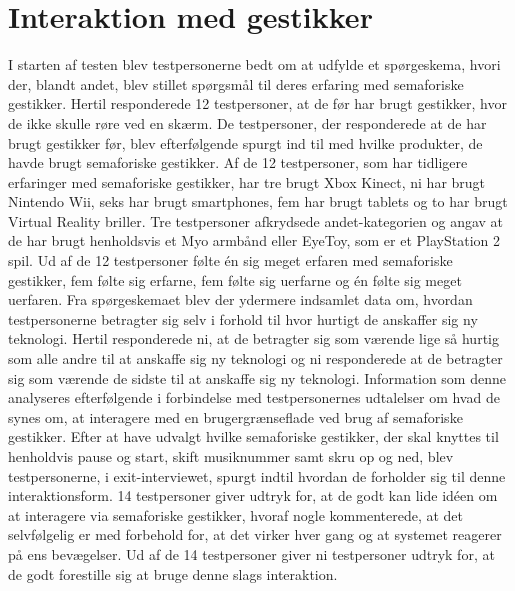 \section{Interaktion med gestikker}
\label{TestresultaterInteraktioner}
%
I starten af testen blev testpersonerne bedt om at udfylde et spørgeskema, hvori der, blandt andet, blev stillet spørgsmål til deres erfaring med semaforiske gestikker. Hertil responderede 12 testpersoner, at de før har brugt gestikker, hvor de ikke skulle røre ved en skærm. De testpersoner, der responderede at de har brugt gestikker før, blev efterfølgende spurgt ind til med hvilke produkter, de havde brugt semaforiske gestikker. Af de 12 testpersoner, som har tidligere erfaringer med semaforiske gestikker, har tre brugt Xbox Kinect, ni har brugt Nintendo Wii, seks har brugt smartphones, fem har brugt tablets og to har brugt Virtual Reality briller. Tre testpersoner afkrydsede andet-kategorien og angav at de har brugt henholdsvis et Myo armbånd eller EyeToy, som er et PlayStation 2 spil. Ud af de 12 testpersoner følte én sig meget erfaren med semaforiske gestikker, fem følte sig erfarne, fem følte sig uerfarne og én følte sig meget uerfaren. Fra spørgeskemaet blev der ydermere indsamlet data om, hvordan testpersonerne betragter sig selv i forhold til hvor hurtigt de anskaffer sig ny teknologi. Hertil responderede ni, at de betragter sig som værende lige så hurtig som alle andre til at anskaffe sig ny teknologi og ni responderede at de betragter sig som værende de sidste til at anskaffe sig ny teknologi. Information som denne analyseres efterfølgende i forbindelse med testpersonernes udtalelser om hvad de synes om, at interagere med en brugergrænseflade ved brug af semaforiske gestikker. \blankline
%
Efter at have udvalgt hvilke semaforiske gestikker, der skal knyttes til henholdvis pause og start, skift musiknummer samt skru op og ned, blev testpersonerne, i exit-interviewet, spurgt indtil hvordan de forholder sig til denne interaktionsform. 14 testpersoner giver udtryk for, at de godt kan lide idéen om at interagere via semaforiske gestikker, hvoraf nogle kommenterede, at det selvfølgelig er med forbehold for, at det virker hver gang og at systemet reagerer på ens bevægelser. Ud af de 14 testpersoner giver ni testpersoner udtryk for, at de godt forestille sig at bruge denne slags interaktion. 


